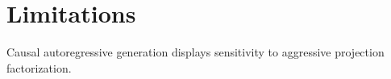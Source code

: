 \section{Limitations}Causal autoregressive generation displays sensitivity to aggressive projection factorization.
